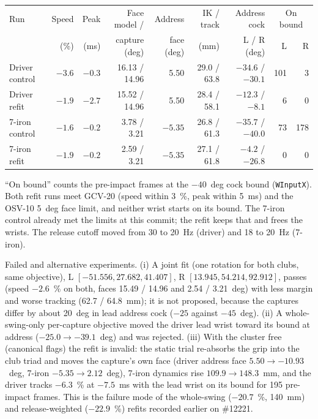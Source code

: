 \documentclass[11pt,a4paper]{article}
\begin{document}
\begin{center}
\footnotesize
\begin{tabular}{lrrrrrrrr}
\hline
Run & Speed & Peak & Face model / & Address & IK / track & Address cock & \multicolumn{2}{c}{On bound} \\
 & (\%) & (ms) & capture (deg) & face (deg) & (mm) & L / R (deg) & L & R \\
\hline
Driver control & $-3.6$ & $-0.3$ & 16.13 / 14.96 & 5.50 & 29.0 / 63.8 & $-34.6$ / $-30.1$ & 101 & 3 \\
Driver refit & $-1.9$ & $-2.7$ & 15.52 / 14.96 & 5.50 & 28.4 / 58.1 & $-12.3$ / $-8.1$ & 6 & 0 \\
7-iron control & $-1.6$ & $-0.2$ & 3.78 / 3.21 & $-5.35$ & 26.8 / 61.3 & $-35.7$ / $-40.0$ & 73 & 178 \\
7-iron refit & $-1.9$ & $-0.2$ & 2.59 / 3.21 & $-5.35$ & 27.1 / 61.8 & $-4.2$ / $-26.8$ & 0 & 0 \\
\hline
\end{tabular}
\end{center}
``On bound'' counts the pre-impact frames at the $-40$~deg cock bound
(\texttt{WInputX}). Both refit runs
meet GCV-20 (speed within 3~\%, peak within 5~ms) and the OSV-10 5~deg face limit,
and neither wrist starts on its bound. The 7-iron control already met the limits at
this commit; the refit keeps that and frees the wrists. The release cutoff moved
from 30 to 20~Hz (driver) and 18 to 20~Hz (7-iron).

Failed and alternative experiments. (i) A joint fit (one rotation for both clubs,
same objective), L $[-51.556, 27.682, 41.407]$, R $[13.945, 54.214, 92.912]$,
passes (speed $-2.6$~\% on both, faces 15.49 / 14.96 and 2.54 / 3.21~deg) with less
margin and worse tracking (62.7 / 64.8~mm); it is not proposed, because the
captures differ by about 20~deg in lead address cock ($-25$ against $-45$~deg).
(ii) A whole-swing-only per-capture objective moved the driver lead wrist toward its
bound at address ($-25.0 \to -39.1$~deg) and was rejected. (iii) With the cluster
free (canonical flags) the refit is invalid: the static trial re-absorbs the grip
into the club triad and moves the capture's own face (driver address face
$5.50 \to -10.93$~deg, 7-iron $-5.35 \to 2.12$~deg), 7-iron dynamics rise
$109.9 \to 148.3$~mm, and the driver tracks $-6.3$~\% at $-7.5$~ms with the lead
wrist on its bound for 195 pre-impact frames. This is the failure mode of the
whole-swing ($-20.7$~\%, 140~mm) and release-weighted ($-22.9$~\%) refits
recorded earlier on \#12221.
\end{document}

